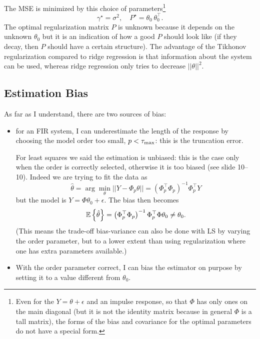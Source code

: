 The MSE is minimized by this choice of parameters\footnote{Even for the $Y=\theta+\epsilon$ and an impulse response, so that $\Phi$ has only ones on the main diagonal (but it is not the identity matrix because in general $\Phi$ is a tall matrix), the forms of the bias and covariance for the optimal parameters do not have a special form.}
\begin{equation*}
  \gamma^\star = \sigma^2,\hspace{1em} P^\star = \theta_0^{\phantom{\top}} \theta_0^\top.
\end{equation*}
The optimal regularization matrix $P$ is unknown because it depends on the unknown $\theta_0$ but it is an indication of how a good $P$ should look like (if they decay, then $P$ should have a certain structure). The advantage of the Tikhonov regularization compared to ridge regression is that information about the system can be used, whereas ridge regression only tries to decrease $||\theta||^2$.

\subsection{Estimation Bias}
\label{sec:estimation-bias}

As far as I understand, there are two sources of bias:
\begin{itemize}
\item for an FIR system, I can underestimate the length of the response by choosing the model order too small, $p<\tau_\text{max}$: this is the truncation error.

  For least squares we said the estimation is unbiased: this is the case only when the order is correctly selected, otherwise it is too biased (see slide 10--10). Indeed we are trying to fit the data as
  \begin{equation*}
    \hat{\theta} = \arg \min_\theta ||Y - \Phi_p\theta|| = \left(\Phi_p^\top \Phi_p\right)^{-1}\Phi_p^\top Y
  \end{equation*}
  but the model is $Y = \Phi\theta_0 + \epsilon$. The bias then becomes
  \begin{equation*}
    \mathbb{E}\left\{\hat{\theta}\right\} = \left(\Phi_p^\top \Phi_p\right)^{-1}\Phi_p^\top\Phi \theta_0 \neq \theta_0.
  \end{equation*}
  (This means the trade-off bias-variance can also be done with LS by varying the order parameter, but to a lower extent than using regularization where one has extra parameters available.)
\item With the order parameter correct, I can bias the estimator on purpose by setting it to a value different from $\theta_0$.
\end{itemize}

